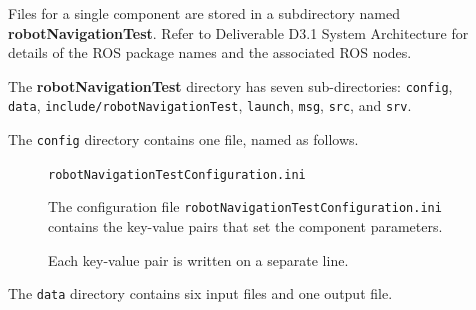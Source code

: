\documentclass{CSSRforAfrica}
\newcommand{\checkboxChecked}{\fbox{\ding{51}}} %
\begin{document}
\begin{description}

\item[\checkboxChecked] Files for a single component are stored in a subdirectory named \textbf{robotNavigationTest}. Refer to Deliverable D3.1 System Architecture for details of the ROS package names and the associated ROS nodes.

\item[\checkboxChecked] The \textbf{robotNavigationTest} directory has seven sub-directories: {\small \verb+config+},   {\small \verb+data+},   {\small \verb+include/robotNavigationTest+},   {\small \verb+launch+}, {\small \verb+msg+},  {\small \verb+src+}, and {\small \verb+srv+}.

\item[\checkboxChecked] The  {\small \verb+config+} directory contains one file, named as follows.

\begin{description}
\item[\checkboxChecked] {\small \verb+robotNavigationTestConfiguration.ini+}  
\item[\checkboxChecked] The configuration file {\small \verb+robotNavigationTestConfiguration.ini+} contains the key-value pairs that set the component parameters.  
\item[\checkboxChecked] Each key-value pair is written on a separate line.
\end{description} 


\item[\checkboxChecked] The  {\small \texttt{data}} directory contains six input files and one output file.


\end{description}
\end{document}
